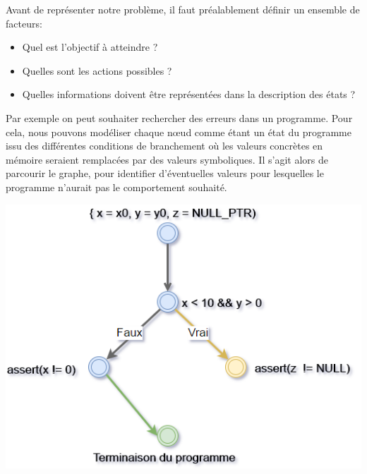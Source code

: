 Avant de représenter notre problème, il faut préalablement définir un ensemble de facteurs:
\begin{itemize}
\item Quel est l'objectif à atteindre ?
\item Quelles sont les actions possibles ?
\item Quelles informations doivent être représentées dans la description des états ?
\end{itemize}

Par exemple on peut souhaiter rechercher des erreurs dans un programme. Pour cela, nous pouvons modéliser chaque nœud comme étant un état du programme issu des différentes conditions de branchement où les valeurs concrètes en mémoire seraient remplacées par des valeurs symboliques. Il s'agit alors de parcourir le graphe, pour identifier d'éventuelles valeurs pour lesquelles le programme n'aurait pas le comportement souhaité.

\begin{center}
    \includegraphics[scale=0.6]{../ressources/images/state_space_graph.png}
\end{center}

